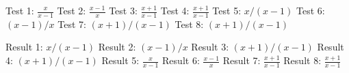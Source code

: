 Test 1: $\frac x  {x-1}$
Test 2: $\frac {x-1} x$
Test 3: $\frac{x+1}{x-1}$
Test 4: $\frac {x+1}  {x-1}$
Test 5: $x / (x-1)$
Test 6: $(x-1) /x$
Test 7: $(x+1)  /(x-1)$
Test 8: $(x+1)/ (x-1)$

Result 1: $x/(x-1)$
Result 2: $(x-1)/x$
Result 3: $(x+1)/(x-1)$
Result 4: $(x+1)/(x-1)$
Result 5: $\frac x {x-1}$
Result 6: $\frac {x-1} x$
Result 7: $\frac{x+1}{x-1}$
Result 8: $\frac{x+1}{x-1}$
